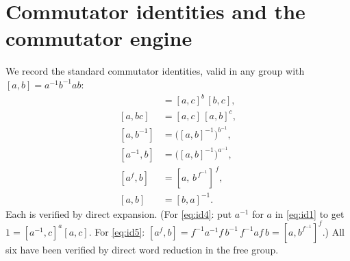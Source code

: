 \documentclass{amsart}
\theoremstyle{definition}
\theoremstyle{remark}
\begin{document}
\section{Commutator identities and the commutator engine}\label{sec:engine}

We record the standard commutator identities, valid in any group with
$[a,b]=a^{-1}b^{-1}ab$:
\begin{align}
[ab,c]&=[a,c]^{b}\,[b,c], \label{eq:id1}\\
[a,bc]&=[a,c]\,[a,b]^{c}, \label{eq:id2}\\
[a,b^{-1}]&=\big([a,b]^{-1}\big)^{b^{-1}}, \label{eq:id3}\\
[a^{-1},b]&=\big([a,b]^{-1}\big)^{a^{-1}}, \label{eq:id4}\\
[a^{f},b]&=[a,\,b^{\,f^{-1}}]^{\,f}, \label{eq:id5}\\
[a,b]&=[b,a]^{-1}. \label{eq:id6}
\end{align}
Each is verified by direct expansion. (For \eqref{eq:id4}: put $a^{-1}$ for $a$ in
\eqref{eq:id1} to get $1=[a^{-1},c]^{a}[a,c]$. For \eqref{eq:id5}:
$[a^f,b]=f^{-1}a^{-1}f\,b^{-1}\,f^{-1}af\,b=[a,b^{f^{-1}}]^{f}$.) All six have been
verified by direct word reduction in the free group.
\end{document}
